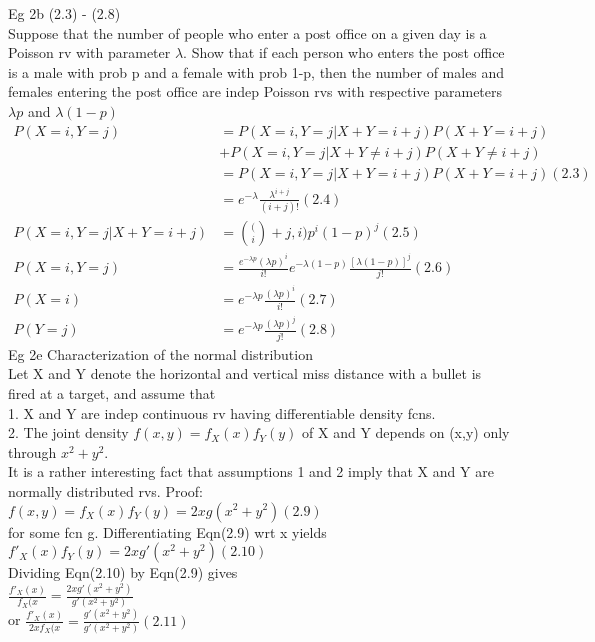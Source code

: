 \documentclass{article}
\begin{document}
Eg 2b (2.3) - (2.8) \\
Suppose that the number of people who enter a post office on a given day is a Poisson rv with parameter $\lambda$. Show that if each person who enters the post office is a male with prob p and a female with prob 1-p, then the number of males and females entering the post office are indep Poisson rvs with respective parameters $\lambda p$ and $\lambda (1-p)$ 
\begin{align*}
    P(X = i, Y =j)  &= P(X = i, Y =j | X + Y = i + j)P(X + Y = i + j) \\              &+ P(X = i, Y =j | X + Y \neq i + j)P(X + Y \neq i + j) \\ 
                    &= P(X = i, Y =j | X + Y = i + j)P(X + Y = i + j) (2.3) \\
                    &= e^{-\lambda}\frac{\lambda^{i+j}}{(i+j)!} (2.4) \\
     P(X = i, Y =j | X + Y = i + j) &= \binom(i+j,i)p^i(1-p)^j (2.5) \\
     P(X = i, Y =j) &= \frac{e^{-\lambda p}(\lambda p)^i}{i!}e^{-\lambda (1-p)}\frac{[\lambda(1-p)]^j}{j!} (2.6) \\
     P(X=i)         &= e^{-\lambda p}\frac{(\lambda p)^i}{i!} (2.7) \\
     P(Y=j)         &= e^{-\lambda p}\frac{(\lambda p)^j}{j!} (2.8)
\end{align*}
Eg 2e Characterization of the normal distribution \\
Let X and Y denote the horizontal and vertical miss distance with a bullet is fired at a target, and assume that \\
1. X and Y are indep continuous rv having differentiable density fcns. \\
2. The joint density $f(x,y)=f_X(x)f_Y(y)$ of X and Y depends on (x,y) only through $x^2 + y^2$.\\
It is a rather interesting fact that assumptions 1 and 2 imply that X and Y are normally distributed rvs. Proof:\\ 
$f(x,y)=f_X(x)f_Y(y)=2x g(x^2 + y^2)(2.9)$ \\
for some fcn g. Differentiating Eqn(2.9) wrt x yields \\
$f'_X(x)f_Y(y)=2x g'(x^2 + y^2) (2.10)$\\
Dividing Eqn(2.10) by Eqn(2.9) gives \\
$\frac{f'_X(x)}{f_X(x} = \frac{2x g'(x^2 + y^2)}{g'(x^2 + y^2)}$\\
or $\frac{f'_X(x)}{2x f_X(x} = \frac{g'(x^2 + y^2)}{g'(x^2 + y^2)}(2.11)$\\
\end{document}
